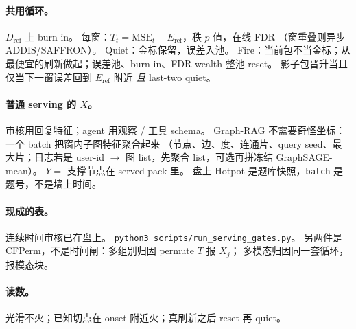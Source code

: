 \paragraph{共用循环。}
\(D_{\mathrm{ref}}\) 上 burn-in。
每窗：\(T_t=\mathrm{MSE}_t-E_{\mathrm{ref}}\)，秩 \(p\) 值，在线 FDR
（窗重叠则异步 ADDIS/SAFFRON）。
Quiet：金标保留，误差入池。
Fire：当前包不当金标；从最便宜的刷新做起；误差池、burn-in、FDR wealth 整池 reset。
影子包晋升当且仅当下一窗误差回到 \(E_{\mathrm{ref}}\) 附近 \emph{且} last-two quiet。

\paragraph{普通 serving 的 \(X\)。}
审核用回复特征；agent 用观察 / 工具 schema。
Graph-RAG 不需要奇怪坐标：一个 batch 把窗内子图特征聚合起来
（节点、边、度、连通片、query seed、最大片；日志若是 user-id \(\to\) 图 list，先聚合 list，可选再拼冻结 GraphSAGE-mean）。
\(Y=\) 支撑节点在 served pack 里。
盘上 Hotpot 是题库快照，\texttt{batch} 是题号，不是墙上时间。

\paragraph{现成的表。}
连续时间审核已在盘上。
\texttt{python3 scripts/run\_serving\_gates.py}。
另两件是 CFPerm，不是时间闸：多组别归因 permute \(T\) 报 \(X_j\)；
多模态归因同一套循环，报模态块。

\paragraph{读数。}
光滑不火；已知切点在 onset 附近火；真刷新之后 reset 再 quiet。
